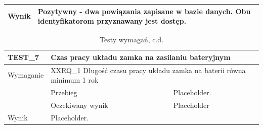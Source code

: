 \begin{table}[h!]
\begin{subtable}[c]{\textwidth}
\begin{tabular}{|p{2cm}|p{}|p{}|}
                    \cellcolor[gray]{0.8} Wynik                 & \multicolumn{2}{p{12cm}|}{Pozytywny - dwa powiązania zapisane w bazie danych. Obu identyfikatorom przyznawany jest dostęp.}                                                                                  \\ \hline
                    \end{tabular}%
                \label{tbl:test6}
                \vspace{10mm}           
            \end{subtable}
            \label{tbl:tests}
        \end{table}
    
        \pagebreak  

        \begin{table}[h!]
            \ContinuedFloat
            \caption{Testy wymagań, c.d.}
            \begin{subtable}[c]{\textwidth}
                \centering
                    \begin{tabular}{|p{2cm}|p{}|p{}|}
                    \hline
                    TEST\_7               & \multicolumn{2}{l|}{\textbf{Czas pracy układu zamka na zasilaniu bateryjnym}}                                                            \\ \hline
                    \cellcolor[gray]{0.8} Wymaganie             & \multicolumn{2}{p{12cm}|}{XXRQ\_1 Długość czasu pracy układu zamka na baterii równa minimum 1 rok }                                                                                    \\ \hline
                    \cellcolor[gray]{0.8} \multirow{2}{*}{Opis} & Przebieg           & Placeholder.  \\ \cline{2-3} 
                    \cellcolor[gray]{0.8}                      & Oczekiwany wynik   & Placeholder                                                 \\ \hline
                    \cellcolor[gray]{0.8} Wynik                 & \multicolumn{2}{p{12cm}|}{Placeholder.}                                                                                  \\ \hline
                    \end{tabular}%
                \label{tbl:test6}
                \vspace{10mm}           
            \end{subtable}
        \quad%
            \begin{subtable}[c]{\textwidth}

\end{subtable}
\end{table}
